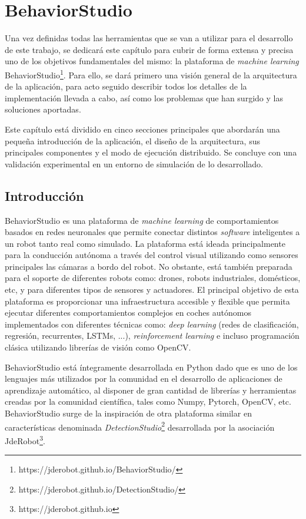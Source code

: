 \chapter{BehaviorStudio}

Una vez definidas todas las herramientas que se van a utilizar para el desarrollo de este trabajo, se dedicará este capítulo para cubrir de forma extensa y precisa uno de los objetivos fundamentales del mismo: la plataforma de \textit{machine learning} BehaviorStudio\footnote{https://jderobot.github.io/BehaviorStudio/}.
Para ello, se dará primero una visión general de la arquitectura de la aplicación, para acto seguido describir todos los detalles de la implementación llevada a cabo, así como los problemas que han surgido y las soluciones aportadas.

Este capítulo está dividido en cinco secciones principales que abordarán una pequeña introducción de la aplicación, el diseño de la arquitectura, sus principales componentes y el modo de ejecución distribuido. Se concluye con una validación experimental en un entorno de simulación de lo desarrollado.

\section{Introducción}

BehaviorStudio es una plataforma de \textit{machine learning} de comportamientos basados en redes neuronales que permite conectar distintos \textit{software} inteligentes a un robot tanto real como simulado. La plataforma está ideada principalmente para la conducción autónoma a través del control visual utilizando como sensores principales las cámaras a bordo del robot. No obstante, está también preparada para el soporte de diferentes robots como: drones, robots industriales, domésticos, etc, y para diferentes tipos de sensores y actuadores. El principal objetivo de esta plataforma es proporcionar una infraestructura accesible y flexible que permita ejecutar diferentes comportamientos complejos en coches autónomos implementados con diferentes técnicas como: \textit{deep learning} (redes de clasificación, regresión, recurrentes, LSTMs, ...), \textit{reinforcement learning} e incluso programación clásica utilizando librerías de visión como OpenCV.

BehaviorStudio está íntegramente desarrollada en Python dado que es uno de los lenguajes más utilizados por la comunidad en el desarrollo de aplicaciones de aprendizaje automático, al disponer de gran cantidad de librerías y herramientas creadas por la comunidad científica, tales como Numpy, Pytorch, OpenCV, etc. BehaviorStudio surge de la inspiración de otra plataforma similar en características denominada \textit{DetectionStudio}\footnote{https://jderobot.github.io/DetectionStudio/} desarrollada por la asociación JdeRobot\footnote{https://jderobot.github.io}.

